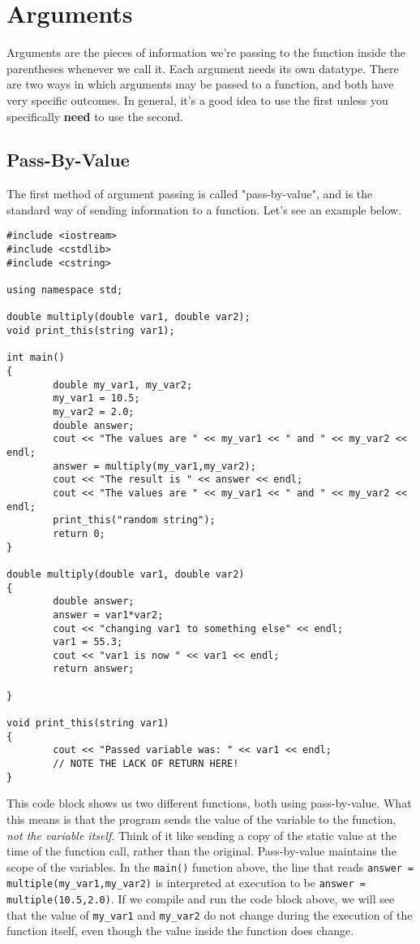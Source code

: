 \section{Arguments}
Arguments are the pieces of information we're passing to the function inside the parentheses whenever we call it.  Each argument needs its own datatype.  There are two ways in which arguments may be passed to a function, and both have very specific outcomes.  In general, it's a good idea to use the first unless you specifically \textbf{need} to use the second.

\subsection{Pass-By-Value}
The first method of argument passing is called "pass-by-value", and is the standard way of sending information to a function.  Let's see an example below.

\begin{verbatim}
#include <iostream>
#include <cstdlib>
#include <cstring>

using namespace std;

double multiply(double var1, double var2);
void print_this(string var1);

int main()
{
        double my_var1, my_var2;
        my_var1 = 10.5;
        my_var2 = 2.0;
        double answer;
        cout << "The values are " << my_var1 << " and " << my_var2 << endl;
        answer = multiply(my_var1,my_var2);
        cout << "The result is " << answer << endl;
        cout << "The values are " << my_var1 << " and " << my_var2 << endl;
        print_this("random string");
        return 0;
}

double multiply(double var1, double var2)
{
        double answer;
        answer = var1*var2;
        cout << "changing var1 to something else" << endl;
        var1 = 55.3;
        cout << "var1 is now " << var1 << endl;
        return answer;

}

void print_this(string var1)
{
        cout << "Passed variable was: " << var1 << endl;
        // NOTE THE LACK OF RETURN HERE!
}
\end{verbatim}

This code block shows us two different functions, both using pass-by-value.  What this means is that the program sends the value of the variable to the function, \textit{not the variable itself}.  Think of it like sending a copy of the static value at the time of the function call, rather than the original.  Pass-by-value maintains the scope of the variables.  In the \texttt{main()} function above, the line that reads \texttt{answer = multiple(my\_var1,my\_var2)} is interpreted at execution to be \texttt{answer = multiple(10.5,2.0)}.  If we compile and run the code block above, we will see that the value of \texttt{my\_var1} and \texttt{my\_var2} do not change during the execution of the function itself, even though the value inside the function does change.
